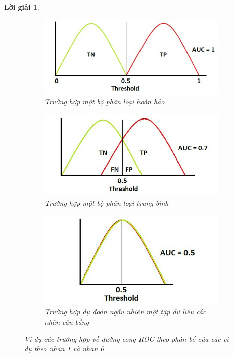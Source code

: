 \documentclass[14pt, a4paper]{article}
\theoremstyle{sltheorem}
\theoremstyle{soltheorem}
\newtheorem*{loigiai}{Lời giải}
\begin{document}
\begin{loigiai}
        \begin{figure}[h!]
            \centering
            \begin{subfigure}[b]{0.4\textwidth}
                \centering
                \includegraphics[width=1.0\textwidth]{figures/ROC_Example_1.jpg}
                \caption{Trường hợp một bộ phân loại hoàn hảo}
                \label{fig:ROC_Example_1}
            \end{subfigure}
            \hfill
            \begin{subfigure}[b]{0.4\textwidth}
                \centering
                \includegraphics[width=1.0\linewidth]{figures/ROC_Example_2.jpg}
                \caption{Trường hợp một bộ phân loại trung bình}
                \label{fig:ROC_Example_2}
            \end{subfigure}
            \hfill
            \begin{subfigure}[b]{0.4\textwidth}
                \centering
                \includegraphics[width=1.0\linewidth]{figures/ROC_Example_3.jpg}
                \caption{Trường hợp dự đoán ngẫu nhiên một tập dữ liệu các nhãn cân bằng}
                \label{fig:ROC_Example_3}
            \end{subfigure}
            \caption{Ví dụ các trường hợp về đường cong ROC theo phân bố của các ví dụ theo nhãn 1 và nhãn 0}
            \label{fig:ROC_Example}
        \end{figure}


\end{loigiai}
\end{document}
